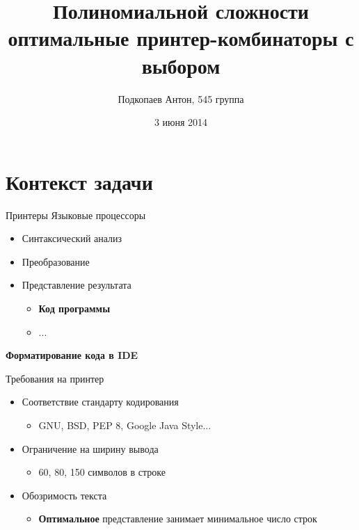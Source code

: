 \documentclass[sans]{beamer}
\begin{document}
\title
[PTOPPCC]
{Полиномиальной сложности оптимальные принтер-комбинаторы с выбором}
\author
[Подкопаев Антон]
{Подкопаев Антон, 545 группа}
\date [03-06-14]{3 июня 2014}

\begin{frame}[plain]
	\titlepage
\end{frame}

\section{Контекст задачи}

\begin{frame}{Принтеры}
	Языковые процессоры

	\begin{block}{}
		\begin{itemize}
			\item Синтаксический анализ
			\item Преобразование
			\item Представление результата
			\begin{itemize}
				\item \textbf{Код программы}
				\item ...
			\end{itemize}
		\end{itemize}
	\end{block}
  
  \textbf{Форматирование кода в IDE}

\end{frame}

\begin{frame}{Требования на принтер}
  \begin{itemize}
    \item Соответствие стандарту кодирования
      \begin{itemize}
        \item GNU, BSD, PEP 8, Google Java Style...
      \end{itemize}
      \vfill
    \item Ограничение на ширину вывода
      \begin{itemize}
        \item 60, 80, 150 символов в строке
      \end{itemize}
      \vfill
    \item Обозримость текста
      \begin{itemize}
        \item \textbf{Оптимальное} представление занимает
          минимальное число строк
      \end{itemize}
  \end{itemize}
\end{frame}
\end{document}

